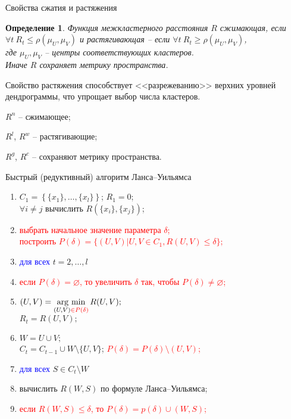 \documentclass[unicode, notheorems, pdf]{beamer}
\DeclareMathOperator*{\argmin}{arg\,\min}
\newtheorem{definition}{Определение}
\begin{document}
\begin{frame}{Свойства сжатия и растяжения}
	\begin{definition}
		Функция межкластерного расстояния $R$ сжимающая, если $\forall t\:R_t\le \rho(\mu_U,\mu_V)$ и растягивающая -- если $\forall t\:R_t\ge \rho(\mu_U,\mu_V)$,\\
		где $\mu_U,\mu_V$ -- центры соответствующих кластеров.\\
		Иначе $R$ сохраняет метрику пространства.
	\end{definition}
	Свойство растяжения способствует <<разрежеванию>> верхних уровней дендрограммы, что упрощает выбор числа кластеров.

	\vspace{.5cm}
	$R^n$ -- сжимающее;

	$R^l$, $R^w$ -- растягивающие;

	$R^g$, $R^c$ -- сохраняют метрику пространства.
\end{frame}

\begin{frame}{Быстрый (редуктивный) алгоритм Ланса--Уильямса}
	\begin{enumerate}
		\item $C_1=\left\{\{x_1\},\dots,\{x_l\}\right\}$; $R_1=0$;\\
		$\forall i\not=j$ вычислить $R\left(\{x_i\},\{x_j\}\right)$;
		\item \textcolor{red}{выбрать начальное значение параметра $\delta$;\\
		построить $P(\delta)=\{(U,V)|U,V\in C_1,R(U,V)\le\delta\};$}
		\item\textcolor{blue}{для всех} $t=2, \dots, l$
		\item\hspace{.5cm}\textcolor{red}{если $P(\delta) = \varnothing$, то увеличить $\delta$ так, чтобы $P(\delta) \not= \varnothing$;}
		\item\hspace{.5cm}$\displaystyle(U,V)=\argmin_{(U,V)\textcolor{red}{\in P(\delta)}}R(U,V);$\\
		\hspace{.5cm}$R_t=R(U,V);$
		\item\hspace{.5cm}$W=U\cup V;$\\
			\hspace{.5cm}$C_t = C_{t-1} \cup W \setminus \{U,V\}$; \textcolor{red}{$P(\delta) = P(\delta) \setminus (U,V)$;}
		\item\hspace{.5cm}\textcolor{blue}{для всех} $S\in C_t\setminus W$
		\item\hspace{1cm}вычислить $R(W,S)$ по формуле Ланса--Уильямса;
		\item\hspace{1cm}\textcolor{red}{если $R(W,S)\le\delta$, то $P(\delta)=p(\delta)\cup(W,S)$;}
	\end{enumerate}
\end{frame}
\end{document}
